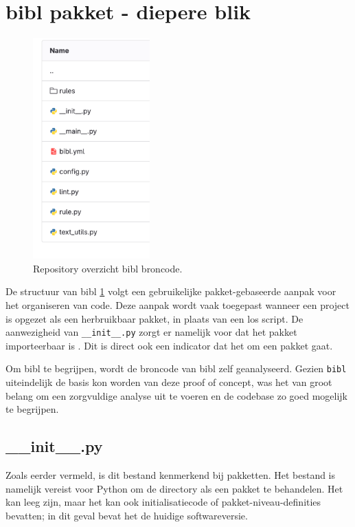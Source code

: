 \section{bibl pakket - diepere blik}
\label{sec:bibl-in-depth}
\begin{figure}[ht]
    \centering
    \includegraphics[width=0.4\textwidth]{./files/bibl_src.png}
    \caption[bibl repository - Source code]{Repository overzicht bibl broncode.}
    \label{fig:bibl_src}
\end{figure}

De structuur van bibl \ref{fig:bibl_src} volgt een gebruikelijke pakket-gebaseerde aanpak voor het organiseren van code. Deze aanpak wordt vaak toegepast wanneer een project is opgezet als een herbruikbaar pakket, in plaats van een los script. De aanwezigheid van \texttt{\_\_init\_\_.py} zorgt er namelijk voor dat het pakket importeerbaar is \autocite{Loubser2021}. Dit is direct ook een indicator dat het om een pakket gaat.

Om bibl te begrijpen, wordt de broncode van bibl zelf geanalyseerd. Gezien \texttt{bibl} uiteindelijk de basis kon worden van deze proof of concept, was het van groot belang om een zorgvuldige analyse uit te voeren en de codebase zo goed mogelijk te begrijpen.

\subsection{\_\_init\_\_.py}
Zoals eerder vermeld, is dit bestand kenmerkend bij pakketten. Het bestand is namelijk vereist voor Python om de directory als een pakket te behandelen. Het kan leeg zijn, maar het kan ook initialisatiecode of pakket-niveau-definities bevatten; in dit geval bevat het de huidige softwareversie.

